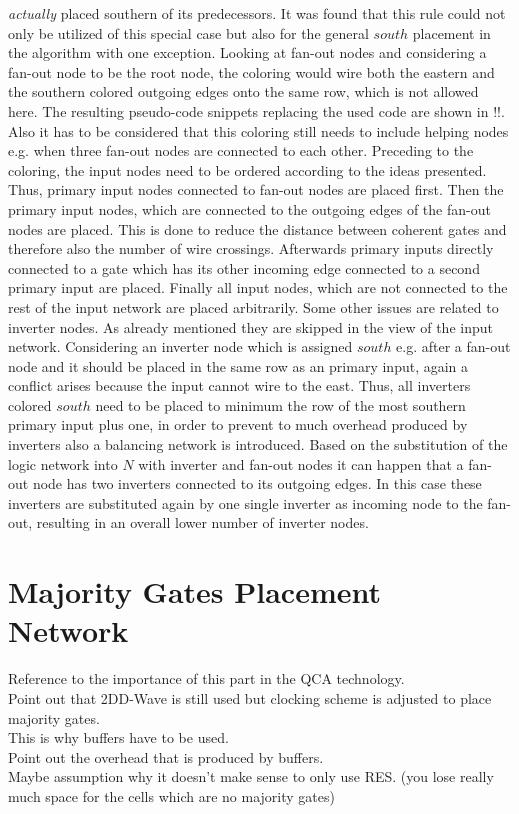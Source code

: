 \textit{actually} placed southern of its predecessors. It was found that this rule could not only be utilized of this special case but also for the general $south$ placement in the algorithm with one exception. Looking at fan-out nodes and considering a fan-out node to be the root node, the coloring would wire both the eastern and the southern colored outgoing edges onto the same row, which is not allowed here. The resulting pseudo-code snippets replacing the used code are shown in !!. Also it has to be considered that this coloring still needs to include helping nodes e.g. when three fan-out nodes are connected to each other. Preceding to the coloring, the input nodes need to be ordered according to the ideas presented. Thus, primary input nodes connected to fan-out nodes are placed first. Then the primary input nodes, which are connected to the outgoing edges of the fan-out nodes are placed. This is done to reduce the distance between coherent gates and therefore also the number of wire crossings. Afterwards primary inputs directly connected to a gate which has its other incoming edge connected to a second primary input are placed. Finally all input nodes, which are not connected to the rest of the input network are placed arbitrarily.
Some other issues are related to inverter nodes. As already mentioned they are skipped in the view of the input network. Considering an inverter node which is assigned $south$ e.g. after a fan-out node and it should be placed in the same row as an primary input, again a conflict arises because the input cannot wire to the east. Thus, all inverters colored $south$ need to be placed to minimum the row of the most southern primary input plus one, in order to prevent to much overhead produced by inverters also a balancing network is introduced. Based on the substitution of the logic network into $N$ with inverter and fan-out nodes it can happen that a fan-out node has two inverters connected to its outgoing edges. In this case these inverters are substituted again by one single inverter as incoming node to the fan-out, resulting in an overall lower number of inverter nodes.

\section{Majority Gates Placement Network}
Reference to the importance of this part in the QCA technology. \\
Point out that 2DD-Wave is still used but clocking scheme is adjusted to place majority gates.\\
This is why buffers have to be used.\\
Point out the overhead that is produced by buffers.\\
Maybe assumption why it doesn't make sense to only use RES. (you lose really much space for the cells which are no majority gates)


